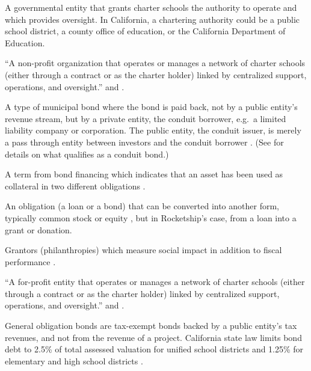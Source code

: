 \begin{description}[nosep]
  \medskip\item[charter school authorizer] A governmental entity that grants charter schools the authority to operate and which provides oversight. In California, a chartering authority could be a public school district, a county office of education, or the California Department of Education. \parencite{NACSA2024}

  \medskip\item[charter management organization (CMO)] ``A non-profit organization that operates or manages a network of charter schools (either through a contract or as the charter holder) linked by centralized support, operations, and oversight.'' \parencite[2]{USDoEd2021} and \parencite{CDE2023a}.

  \medskip\item[conduit bond] A type of municipal bond where the bond is paid back, not by a public entity's revenue stream, but by a private entity, the conduit borrower, e.g. a limited liability company or corporation. The public entity, the conduit issuer, is merely a pass through entity between investors and the conduit borrower \parencite{Cooper2017}. (See \textcite{GASB91_2019} for details on what qualifies as a conduit bond.) %

  \medskip\item[cross-collateralization] A term from bond financing which indicates that an asset has been used as collateral in two different obligations \parencite{Lip2024}.

  \medskip\item[debt, convertible] An obligation (a loan or a bond) that can be converted into another form, typically common stock or equity \parencite{Chen2020}, but in Rocketship's case, from a loan into a grant or donation.

  \medskip\item[double bottom line grantors] Grantors (philanthropies) which measure social impact in addition to fiscal performance \parencite{Clark.etal2015}.

  \medskip\item[education management organization (EMO)] ``A for-profit entity that operates or manages a network of charter schools (either through a contract or as the charter holder) linked by centralized support, operations, and oversight.'' \parencite[2]{USDoEd2021} and \parencite{CDE2023a}. %

  \medskip\item[general obligation bonds (GO)] General obligation bonds are tax-exempt bonds backed by a public entity's tax revenues, and not from the revenue of a project. California state law limits bond debt to 2.5\% of total assessed valuation for unified school districts and 1.25\% for elementary and high school districts \parencite{CDIAC2014}.


\end{description}
